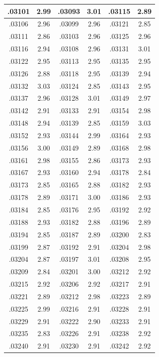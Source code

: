 \documentclass[11pt]{report}
\begin{document}
\begin{appendices}
\begin{longtable}{|c|c||c|c||c|c|}
.03101 & 2.99 & .03093 & 3.01 & .03115 & 2.89\\\hline
.03106 & 2.96 & .03099 & 2.96 & .03121 & 2.85\\\hline
.03111 & 2.86 & .03103 & 2.96 & .03125 & 2.96\\\hline
.03116 & 2.94 & .03108 & 2.96 & .03131 & 3.01\\\hline
.03122 & 2.95 & .03113 & 2.95 & .03135 & 2.95\\\hline
.03126 & 2.88 & .03118 & 2.95 & .03139 & 2.94\\\hline
.03132 & 3.03 & .03124 & 2.85 & .03143 & 2.95\\\hline
.03137 & 2.96 & .03128 & 3.01 & .03149 & 2.97\\\hline
.03142 & 2.91 & .03133 & 2.91 & .03154 & 2.98\\\hline
.03148 & 2.94 & .03139 & 2.85 & .03159 & 3.03\\\hline
.03152 & 2.93 & .03144 & 2.99 & .03164 & 2.93\\\hline
.03156 & 3.00 & .03149 & 2.89 & .03168 & 2.98\\\hline
.03161 & 2.98 & .03155 & 2.86 & .03173 & 2.93\\\hline
.03167 & 2.93 & .03160 & 2.94 & .03178 & 2.84\\\hline
.03173 & 2.85 & .03165 & 2.88 & .03182 & 2.93\\\hline
.03178 & 2.89 & .03171 & 3.00 & .03186 & 2.93\\\hline
.03184 & 2.85 & .03176 & 2.95 & .03192 & 2.92\\\hline
.03188 & 2.93 & .03182 & 2.88 & .03196 & 2.89\\\hline
.03194 & 2.85 & .03187 & 2.89 & .03200 & 2.83\\\hline
.03199 & 2.87 & .03192 & 2.91 & .03204 & 2.98\\\hline
.03204 & 2.87 & .03197 & 3.01 & .03208 & 2.95\\\hline
.03209 & 2.84 & .03201 & 3.00 & .03212 & 2.92\\\hline
.03215 & 2.92 & .03206 & 2.92 & .03217 & 2.91\\\hline
.03221 & 2.89 & .03212 & 2.98 & .03223 & 2.89\\\hline
.03225 & 2.99 & .03216 & 2.91 & .03228 & 2.91\\\hline
.03229 & 2.91 & .03222 & 2.90 & .03233 & 2.91\\\hline
.03235 & 2.83 & .03226 & 2.91 & .03238 & 2.92\\\hline
.03240 & 2.91 & .03230 & 2.91 & .03242 & 2.92\\\hline

\end{longtable}
\end{appendices}
\end{document}

